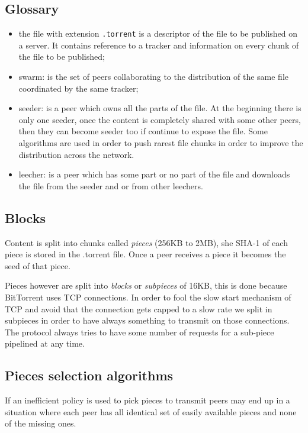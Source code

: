 \subsection{Glossary}
\begin{itemize}
    \item the file with extension \verb|.torrent| is a descriptor of the file to be published on a server.
    It contains reference to a tracker and information on every chunk of the file to be published;

    \item swarm: is the set of peers collaborating to the distribution of the same file coordinated by the same tracker;

    \item seeder: is a peer which owns all the parts of the file.
    At the beginning there is only one seeder, once the content is completely shared with some other peers, then they can become seeder too if continue to expose the file.
    Some algorithms are used in order to push rarest file chunks in order to improve the distribution across the network.

    \item leecher: is a peer which has some part or no part of the file and downloads the file from the seeder and or from other leechers.
\end{itemize}

\subsection{Blocks}
Content is split into chunks called \emph{pieces} (256KB to 2MB), she SHA-1 of each piece is stored in the .torrent file.
Once a peer receives a piece it becomes the seed of that piece.

Pieces however are split into \emph{blocks} or \emph{subpieces} of 16KB, this is done because BitTorrent uses TCP connections.
In order to fool the slow start mechanism of TCP and avoid that the connection gets capped to a slow rate we split in subpieces in order to have always something to transmit on those connections.
The protocol always tries to have some number of requests for a sub-piece pipelined at any time.

\subsection{Pieces selection algorithms}
If an inefficient policy is used to pick pieces to transmit peers may end up in a situation where each peer has all identical set of easily available pieces and none of the missing ones.


